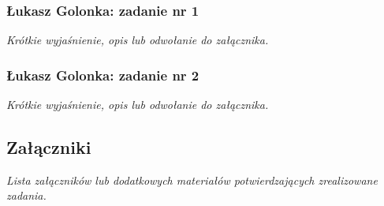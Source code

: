 \documentclass[12pt,a4paper,oneside]{article}
\theoremstyle{definition}
\numberwithin{equation}{section}
\begin{document}
\subsubsection{Łukasz Golonka: zadanie nr 1}
\textit{Krótkie wyjaśnienie, opis lub odwołanie do załącznika.}
\subsubsection{Łukasz Golonka: zadanie nr 2}
\textit{Krótkie wyjaśnienie, opis lub odwołanie do załącznika.}

\subsection{Załączniki}
\textit{Lista załączników lub dodatkowych materiałów potwierdzających zrealizowane zadania.}



\renewcommand\refname{Literatura (jeżeli wymagana)}

\end{document}
